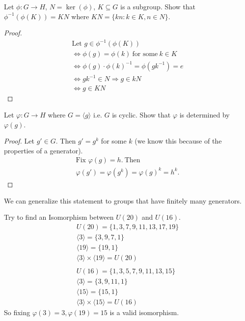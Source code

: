 \documentclass[class=scrartcl, crop=false]{standalone}
\begin{document}
\begin{exercise}
  Let $\phi: G \to H$, $N = \ker(\phi)$, $K \subseteq G$ is a subgroup. Show that $\phi^{-1}(\phi(K)) = KN$ where $KN = \{kn : k \in K, n \in N\}$.
  \begin{proof}
    \begin{gather*}
      \text{Let } g \in \phi^{-1}(\phi(K)) \\
      \Leftrightarrow \phi(g) = \phi(k) \ \text{for some} \ k \in K \\
      \Leftrightarrow \phi(g) \cdot \phi(k)^{-1} = \phi(gk^{-1}) = e \\
      \Leftrightarrow gk^{-1} \in N \Rightarrow g \in kN \\
      \Leftrightarrow g \in KN
    \end{gather*} 
  \end{proof} 
\end{exercise} 

\begin{exercise}
  Let $\varphi: G \to H$ where $G = \langle g \rangle $ i.e. $G$ is cyclic. Show that $\varphi$ is determined by $\varphi(g)$.
  \begin{proof}
    Let $g' \in G$. Then $g' = g^k$ for some $k$ (we know this because of the properties of a generator).
    \begin{gather*}
      \text{Fix } \varphi(g) = h. \ \text{Then} \ \\
      \varphi(g') = \varphi(g^k) = \varphi(g)^k = h^k.
    \end{gather*} 
  \end{proof} 
\end{exercise} 
\begin{remark}
  We can generalize this statement to groups that have finitely many generators.
\end{remark} 

\begin{example}
  Try to find an Isomorphism between $U(20)$ and $U(16)$.
  \begin{gather*}
    U(20) = \{1, 3, 7, 9, 11, 13, 17, 19\} \\
    \langle 3 \rangle = \{3, 9, 7, 1\} \\
    \langle 19 \rangle = \{19, 1\} \\
    \langle 3 \rangle \times \langle 19 \rangle = U(20) \\\\
    U(16) = \{1, 3, 5, 7, 9, 11, 13, 15\} \\
    \langle 3 \rangle = \{3, 9, 11, 1\} \\
    \langle 15 \rangle = \{15, 1\} \\
    \langle 3 \rangle \times \langle 15 \rangle = U(16) 
  \end{gather*} 
  So fixing $\varphi(3) = 3, \varphi(19) = 15$ is a valid isomorphism.
  
\end{example} 
\end{document}

